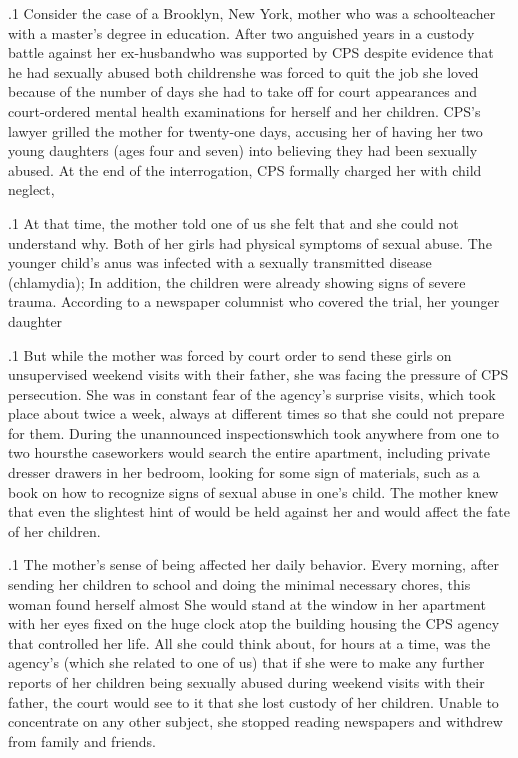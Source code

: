 \documentclass[11pt, twoside]{article}
\begin{document}
{\p.1{%
Consider the case of a Brooklyn, New York, mother who was a
school\-teacher with a master’s degree in education. After two anguished years in a custody battle against her ex-husband\mdash{}who was
supported by CPS despite evidence that he had sexually abused both
children\mdash{}she was forced to quit the job she loved because of the number of days she had to take off for court appearances and court-ordered
mental health examinations for herself and her children.
CPS’s lawyer grilled the mother for twenty-one days, accusing her of
having  her two young daughters (ages four and seven)
into believing they had been sexually abused. At the end of the interrogation, CPS formally charged her with child neglect, 
}%

\p.1{%
At that time, the mother told one of us she felt that  and she could not understand why. Both of her
girls had physical symptoms of sexual abuse. The younger child’s anus
was infected with a sexually transmitted disease (chlamydia);  In
addition, the children were already showing signs of severe trauma. According to a newspaper columnist who covered the trial, her younger
daughter 
}%

\p.1{%
But while the mother was forced by court order to send these girls
on unsupervised weekend visits with their father, she was facing the
pressure of CPS persecution. She was in constant fear of the agency’s
surprise visits, which took place about twice a week, always at different
times so that she could not prepare for them. During the unannounced
inspections\mdash{}which took anywhere from one to two hours\mdash{}the caseworkers would search the entire apartment, including private dresser
drawers in her bedroom, looking for some sign of  materials, such as a book on how to recognize signs of sexual abuse in one’s
child. The mother knew that even the slightest hint of 
would be held against her and would affect the fate of her children.
}%

\p.1{%
The mother’s sense of being  affected her daily behavior.
Every morning, after sending her children to school and doing the minimal necessary chores, this woman found herself almost 
She would stand at the window in her apartment with her eyes fixed
on the huge clock atop the building housing the CPS agency that controlled her life. All she could think about, for hours at a time, was the
agency’s  (which she related to one of us) that if she were to
make any further reports of her children being sexually abused during weekend visits with their father, the court would see to it that she
lost custody of her children. Unable to concentrate on any other subject, she stopped reading newspapers and withdrew from family and
friends.
}%

}
\end{document}
